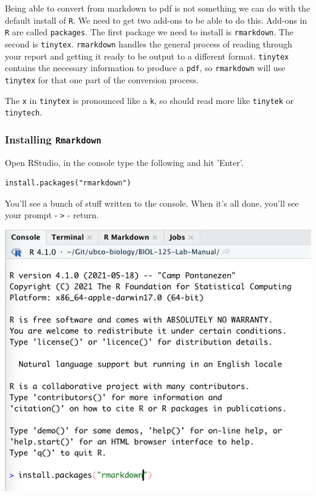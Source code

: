 \documentclass[
]{book}
\begin{document}
Being able to convert from markdown to pdf is not something we can do with the default install of \texttt{R}. We need to get two add-ons to be able to do this. Add-ons in \texttt{R} are called \texttt{packages}. The first package we need to install is \texttt{rmarkdown}. The second is \texttt{tinytex}. \texttt{rmarkdown} handles the general process of reading through your report and getting it ready to be output to a different format. \texttt{tinytex} contains the necessary information to produce a \texttt{pdf}, so \texttt{rmarkdown} will use \texttt{tinytex} for that one part of the conversion process.

The \texttt{x} in \texttt{tinytex} is pronounced like a \texttt{k}, so should read more like \texttt{tinytek} or \texttt{tinytech}.

\hypertarget{installing-rmarkdown}{%
\subsubsection*{\texorpdfstring{Installing \texttt{Rmarkdown}}{Installing Rmarkdown}}\label{installing-rmarkdown}}

Open RStudio, in the console type the following and hit 'Enter'.

\begin{verbatim}
install.packages("rmarkdown")
\end{verbatim}

You'll see a bunch of stuff written to the console. When it's all done, you'll see your prompt - \texttt{\textgreater{}} - return.

\includegraphics{images/Install-RMarkdown_20220101.png}
\end{document}
